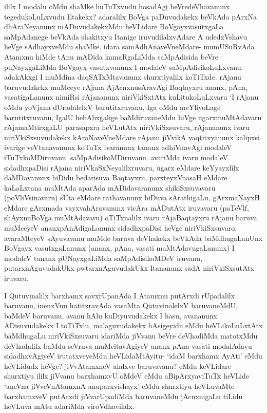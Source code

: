 
\begin{artha}
ililx I modalu oMdu shaMke huTuTxvudu hosadAgi beVredeVhavanunx tegedukoLuLxvudu Etakekx? adaralilx BoVga paDuvudakekx beVkAda pArxNa dhAraNeyanunx mADuvudakekxMdu heVLidare BoVgayxvasutxgaLa saMpAdanege beVkAda shakitxyu Itanige iruvudilalxvAdare A udedxVshavu heVge sAdhayxveMdu shaMke. idara samAdhAnaveVneMdare- mumUSuRvAda Atamxnu hiMde tAnu mADida kamaRgaLiMda saMpAdisida beVre puNayxgaLiMda BoVgayx vasutxvanunx I modaleV saMpAdisikoLuLxvanu. adakAkxgi I muMdina daqSATxMtavanunx shurxtiyalilx koTiTxde. rAjanu baruvudakekx muMceye rAjana AjAcnxnusAravAgi Baqtayxru ananx, pAna, vasatigaLanunx nimiRsi rAjananunx niriVkiSxtAtx kuLitukoLuLxvaru `I rAjanu oMdu yoVjana dUradalelxV barutitxruvanu, Iga oMdu meYliyoLage barutitxruvanu, IgalU hebAbxgalige baMdiruvaneMdu hiVge ugarxmuMtAdavaru rAjamaMtirxgaLU parasapxra heVLutAtx niriVkiSxsuvaru, rAjananunx ivaru niriVkiSxsuvudakekx kAraNaveVneMdare rAjanu jiVvikA vaqtitxyanunx kalipxsi ivarige veVtanavanunx koTuTx ivaranunx tananx adhiVnavAgi modaleV iTuTxkoMDiruvanu. saMpAdisikoMDiruvanu. avariMda ivaru modaleV sidadhxpaDisi rAjana niriVkaSxNeyalilxruvaru, ugarx eMdare keYyayxlilx daMDavanunx hiDidu bedarisuva Baqtayxru, parxteyxVnasaH eMdare kaLaLxtana muMtAda aparAda mADidavaranunx shikiSxsuvavaru (poVliVsinavaru) sUta eMdare rathavanunx biDuva sArathigaLu, gArxmaNayxH eMdare gArxmada vayxvahAravanunx vicAra mADutAtx iruvavaru (paTeVlf, shAyxnuBoVga muMtAdavaru) oTiTxnalilx ivaru rAjaBaqtayxru rAjanu baruva muMceyeV ananxpAnAdigaLanunx sidadhxpaDisi heVge niriVkiSxsuvaro, avaraMteyeV sAyuvavanu muMde baruva deVhakekx beVkAda baMdhugaLanUnx BoVgayx vasutxgaLanunx (ananx, pAna, vasati muMtAdavugaLanunx) I modaleV tananx pUNayxgaLiMda saMpAdisikoMDeV iruvanu, putarxnAguvudakUkx pwtarxnAguvudakUkx Itananunx sadA niriVkiSxsutAtx iruvaru. 
\end{artha}%

\begin{artha}
I Qutuvinalilx barxhamx savxrUpanAda I Atamxnu putArxdi rUpadalilx baruvanu, inenxVnu hatitxravAda vasaMta QutuvinalelxV baruvaneMdU, baMdeV baruvanu, avanu hAlu kuDiyuvudakekx I hasu, avananunx ADisuvudakekx I toTiTxlu, malaguvudakekx hAsigeyidu eMdu heVLikoLuLxtAtx baMdhugaLu niriVkiSxsuvaru idariMda jiVvanu beVre deVhadiMda matotxMdu deVhadalilx baMdu seVruva muMcitavAgiyeV ananx pAna vasati modalAdavu sidadhxvAgiyeV irutatxveyeMdu heVLidaMtAyitu- `idaM barxhamx AyAti' eMdu heVLidudx heVge? jiVvAtamxneV alalxve baruvavanu? eMdu keVLidare shurxtiyu ililx jiVvanu barxhamxvU oMdeV eMdu aBipArxyaviTuTx heVLide `aneVna jiVveVnAtamxnA anuparxvishayx' eMdu shurxtiyu heVLuvaMte barxhamxveV putArxdi jiVvarUpadiMda baruvaneMdu jAcnxnigaLu tiLidu heVLuva mAtu adariMda viroVdhavilalx. 	
\end{artha}%

